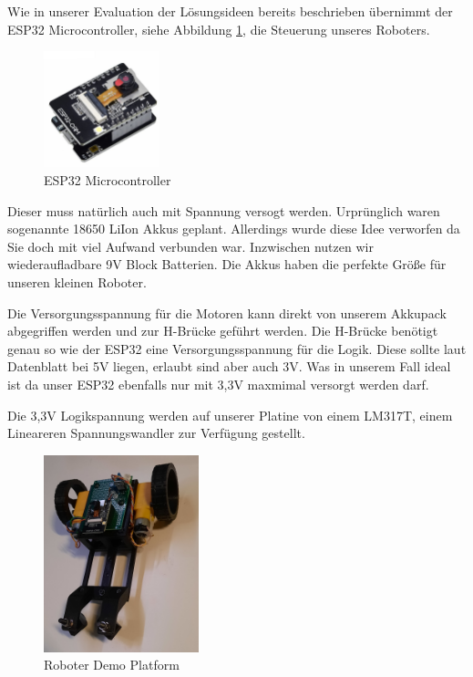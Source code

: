 \begin{flushleft}
    Wie in unserer Evaluation der Lösungsideen bereits beschrieben übernimmt der ESP32 Microcontroller, siehe Abbildung \ref{fig:esp32_mc}, die Steuerung unseres Roboters. 
    
    \begin{figure}[h!]
        \centering
        \includegraphics[width=0.3\textwidth]{imgs/Roboter/Real/esp32.jpg}
        \caption{ESP32 Microcontroller}
        \label{fig:esp32_mc}%
    \end{figure}

    Dieser muss natürlich auch mit Spannung versogt werden.
    Urprünglich waren sogenannte 18650 LiIon Akkus geplant. Allerdings wurde diese Idee verworfen da Sie doch mit viel Aufwand verbunden war.
    Inzwischen nutzen wir wiederaufladbare 9V Block Batterien. Die Akkus haben die perfekte Größe für unseren kleinen Roboter.

    Die Versorgungsspannung für die Motoren kann direkt von unserem Akkupack abgegriffen werden und zur H-Brücke geführt werden.
    Die H-Brücke benötigt genau so wie der ESP32 eine Versorgungsspannung für die Logik.
    Diese sollte laut Datenblatt bei 5V liegen, erlaubt sind aber auch 3V. Was in unserem Fall ideal ist da unser ESP32
    ebenfalls nur mit 3,3V maxmimal versorgt werden darf.

    Die 3,3V Logikspannung werden auf unserer Platine von einem LM317T, einem Lineareren Spannungswandler zur Verfügung gestellt.

    \begin{figure}[h!]
        \centering
        \includegraphics[width=0.4\textwidth, angle=180,origin=c]{imgs/Roboter/Real/Roboter.jpg}
        \caption{Roboter Demo Platform}
    \end{figure}


\end{flushleft}
